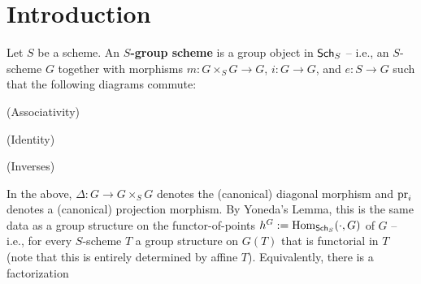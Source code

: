 \documentclass[11pt]{article}
\begin{document}
\section{Introduction}
Let $S$ be a scheme. An \textbf{$S$-group scheme} is a group object in $\operatorname{\mathsf{Sch}}_S$ -- i.e., an $S$-scheme $G$ together with morphisms $m: G\times_SG\to G$, $i: G\to G$, and $e: S\to G$ such that the following diagrams commute:
\begin{enum}{\roman}
\item[] (Associativity)

\begin{center}
\end{center}

\item[] (Identity)

\begin{center}
\end{center}

\item[] (Inverses)

\begin{center}
\end{center}
\end{enum}
In the above, $\Delta: G\to G\times_SG$ denotes the (canonical) diagonal morphism and $\operatorname{pr}_i$ denotes a (canonical) projection morphism. By Yoneda's Lemma, this is the same data as a group structure on the functor-of-points $h^G:=\operatorname{Hom}_{\operatorname{\mathsf{Sch}}_S}(\cdot,G)$ of $G$ -- i.e., for every $S$-scheme $T$ a group structure on $G(T)$ that is functorial in $T$ (note that this is entirely determined by affine $T$). Equivalently, there is a factorization
\end{document}
